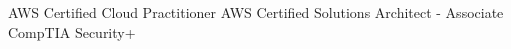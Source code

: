 
\begin{cvcertifications}

    \cvcertification
    {AWS Certified Cloud Practitioner} 
    \cvcertification
      {AWS Certified Solutions Architect - Associate} 
    \cvcertification
    {CompTIA Security+} 

  \end{cvcertifications}